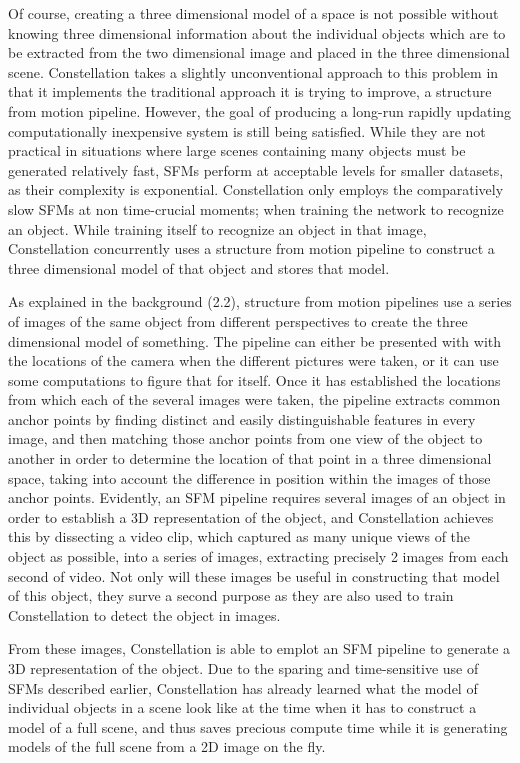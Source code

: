 Of course, creating a three dimensional model of a space is not possible without knowing three dimensional information about the individual objects which are to be extracted from the two dimensional image and placed in the three dimensional scene. Constellation takes a slightly unconventional approach to this problem in that it implements the traditional approach it is trying to improve, a structure from motion pipeline. However, the goal of producing a long-run rapidly updating computationally inexpensive system is still being satisfied. While they are not practical in situations where large scenes containing many objects must be generated relatively fast, SFMs perform at acceptable levels for smaller datasets, as their complexity is exponential. Constellation only employs the comparatively slow SFMs at non time-crucial moments; when training the network to recognize an object. While training itself to recognize an object in that image, Constellation concurrently uses a structure from motion pipeline to construct a three dimensional model of that object and stores that model.

As explained in the background (2.2), structure from motion pipelines use a series of images of the same object from different perspectives to create the three dimensional model of something. The pipeline can either be presented with with the locations of the camera when the different pictures were taken, or it can use some computations to figure that for itself. Once it has established the locations from which each of the several images were taken, the pipeline extracts common anchor points by finding distinct and easily distinguishable features in every image, and then matching those anchor points from one view of the object to another in order to determine the location of that point in a three dimensional space, taking into account the difference in position within the images of those anchor points. Evidently, an SFM pipeline requires several images of an object in order to establish a 3D representation of the object, and Constellation achieves this by dissecting a video clip, which captured as many unique views of the object as possible, into a series of images, extracting precisely 2 images from each second of video. Not only will these images be useful in constructing that model of this object, they surve a second purpose as they are also used to train Constellation to detect the object in images.

 From these images, Constellation is able to emplot an SFM pipeline to generate a 3D representation of the object. Due to the sparing and time-sensitive use of SFMs described earlier, Constellation has already learned what the model of individual objects in a scene look like at the time when it has to construct a model of a full scene, and thus saves precious compute time while it is generating models of the full scene from a 2D image on the fly.